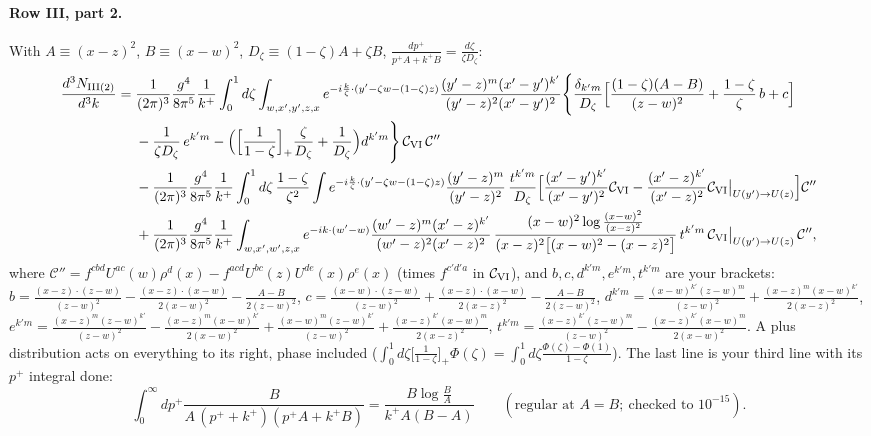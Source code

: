 \documentclass[10pt]{article}
\numberwithin{equation}{section}
\begin{document}
\paragraph{Row III, part 2.} With $A\equiv(x-z)^2$, $B\equiv(x-w)^2$, $D_\zeta\equiv(1-\zeta)A+\zeta B$, $\frac{dp^+}{p^+A+k^+B}=\frac{d\zeta}{\zeta D_\zeta}$:
\begin{align}
\frac{d^3N_{\rm III(2)}}{d^3k}={}&\frac{1}{(2\pi)^3}\frac{g^4}{8\pi^5}\frac1{k^+}\int_0^1d\zeta\int_{w,x',y',z,x}e^{-i\frac{k}{\zeta}\cdot(y'-\zeta w-(1-\zeta)z)}\frac{(y'-z)^m(x'-y')^{k'}}{(y'-z)^2(x'-y')^2}\Bigg\{\frac{\delta_{k'm}}{D_\zeta}\Big[\frac{(1-\zeta)(A-B)}{(z-w)^2}+\frac{1-\zeta}{\zeta}\,b+c\Big]\notag\\
&-\frac{1}{\zeta D_\zeta}\,e^{k'm}-\Big(\Big[\frac{1}{1-\zeta}\Big]_+\frac{\zeta}{D_\zeta}+\frac{1}{D_\zeta}\Big)d^{k'm}\Bigg\}\,\mathcal C_{\rm VI}\,\mathcal C''\notag\\
&-\frac{1}{(2\pi)^3}\frac{g^4}{8\pi^5}\frac1{k^+}\int_0^1d\zeta\,\frac{1-\zeta}{\zeta^2}\int e^{-i\frac{k}{\zeta}\cdot(y'-\zeta w-(1-\zeta)z)}\frac{(y'-z)^m}{(y'-z)^2}\,\frac{t^{k'm}}{D_\zeta}\Big[\frac{(x'-y')^{k'}}{(x'-y')^2}\mathcal C_{\rm VI}-\frac{(x'-z)^{k'}}{(x'-z)^2}\mathcal C_{\rm VI}\big|_{U(y')\to U(z)}\Big]\mathcal C''\notag\\
&+\frac{1}{(2\pi)^3}\frac{g^4}{8\pi^5}\frac{1}{k^+}\int_{w,x',w',z,x}e^{-ik\cdot(w'-w)}\frac{(w'-z)^m(x'-z)^{k'}}{(w'-z)^2(x'-z)^2}\,\frac{(x-w)^2\log\frac{(x-w)^2}{(x-z)^2}}{(x-z)^2\big[(x-w)^2-(x-z)^2\big]}\,t^{k'm}\,\mathcal C_{\rm VI}\big|_{U(y')\to U(z)}\,\mathcal C'',\label{LT:eq:G3III2}
\end{align}
where $\mathcal C''=f^{cbd}U^{ac}(w)\rho^d(x)-f^{acd}U^{bc}(z)U^{de}(x)\rho^e(x)$ (times $f^{c'd'a}$ in $\mathcal C_{\rm VI}$), and $b,c,d^{k'm},e^{k'm},t^{k'm}$ are your brackets: $b=\frac{(x-z)\cdot(z-w)}{(z-w)^2}-\frac{(x-z)\cdot(x-w)}{2(x-w)^2}-\frac{A-B}{2(z-w)^2}$, $c=\frac{(x-w)\cdot(z-w)}{(z-w)^2}+\frac{(x-z)\cdot(x-w)}{2(x-z)^2}-\frac{A-B}{2(z-w)^2}$, $d^{k'm}=\frac{(x-w)^{k'}(z-w)^m}{(z-w)^2}+\frac{(x-z)^m(x-w)^{k'}}{2(x-z)^2}$, $e^{k'm}=\frac{(x-z)^m(z-w)^{k'}}{(z-w)^2}-\frac{(x-z)^m(x-w)^{k'}}{2(x-w)^2}+\frac{(x-w)^m(z-w)^{k'}}{(z-w)^2}+\frac{(x-z)^{k'}(x-w)^m}{2(x-z)^2}$, $t^{k'm}=\frac{(x-z)^{k'}(z-w)^m}{(z-w)^2}-\frac{(x-z)^{k'}(x-w)^m}{2(x-w)^2}$. A plus distribution acts on everything to its right, phase included ($\int_0^1d\zeta\big[\frac1{1-\zeta}\big]_+\Phi(\zeta)=\int_0^1d\zeta\frac{\Phi(\zeta)-\Phi(1)}{1-\zeta}$). The last line is your third line with its $p^+$ integral done:
\begin{equation}
\int_0^\infty dp^+\frac{B}{A\,(p^++k^+)(p^+A+k^+B)}=\frac{B\log\frac BA}{k^+A(B-A)}\qquad(\text{regular at }A=B;\ \text{checked to }10^{-15}).
\end{equation}
\end{document}
